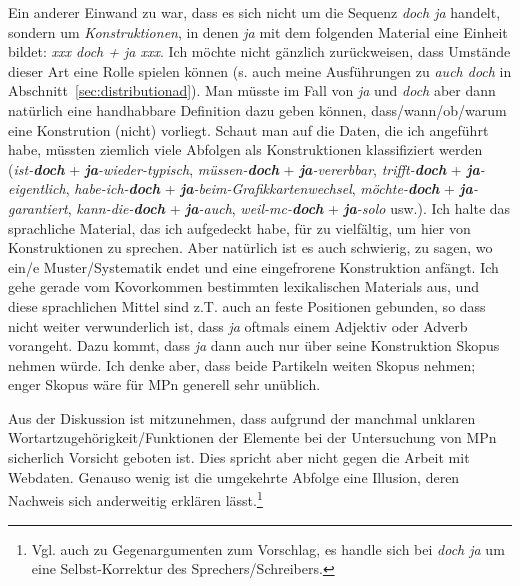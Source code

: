 Ein anderer Einwand zu \citet{Mueller2017b} war, dass es sich nicht um die Sequenz \textit{doch ja} handelt, sondern  um \textit{Konstruktionen}, in denen \textit{ja} mit dem folgenden Material eine Einheit bildet: \textit{xxx doch + ja xxx}. Ich möchte nicht gänz\-lich zurückweisen, dass Umstände dieser Art eine Rolle spielen können (s. auch meine Ausführungen zu \textit{auch doch} in Abschnitt~\ref{sec:distributionad}). Man müsste im Fall von \textit{ja} und \textit{doch} aber dann natürlich eine handhabbare Definition dazu geben können, dass/wann/ob/warum eine Konstrution (nicht) vorliegt. Schaut man auf die Daten, die ich angeführt habe, müssten ziemlich viele Abfolgen als Konstruktionen klassifiziert werden (\textit{ist-\textbf{doch}} + \textit{\textbf{ja}-wieder-typisch}, \textit{müssen-\textbf{doch}} + \textit{\textbf{ja}-vererbbar}, \textit{trifft-\textbf{doch}} + \textit{\textbf{ja}-eigentlich}, \textit{habe-ich-\textbf{doch}} + \textit{\textbf{ja}-beim-Grafikkartenwech\-sel}, \textit{möchte-\textbf{doch}} + \textit{\textbf{ja}-garantiert}, \textit{kann-die-\textbf{doch}} + \textit{\textbf{ja}-auch}, \textit{weil-mc-\textbf{doch}} + \textit{\textbf{ja}-solo} usw.). Ich halte das sprachliche Material, das ich aufgedeckt habe, für zu vielfältig, um hier von Konstruktionen zu sprechen. Aber natürlich ist es auch schwierig, zu sagen, wo ein/e Muster/Systematik endet und eine eingefrorene Konstruktion anfängt. Ich gehe gerade vom Kovorkommen bestimmten lexikali\-schen Materials aus, und diese sprachlichen Mittel sind z.T. auch an feste Positionen gebunden, so dass nicht weiter verwunderlich ist, dass \textit{ja} oftmals einem Adjektiv oder Adverb vorangeht. Dazu kommt, dass \textit{ja} dann auch nur über seine Konstruktion Skopus nehmen würde. Ich denke aber, dass beide Partikeln weiten Skopus  nehmen; enger Skopus wäre für MPn generell sehr unüblich.

Aus der Diskussion ist mitzunehmen, dass aufgrund der manchmal unklaren Wortartzugehörigkeit/Funktionen der Elemente bei der Untersuchung von MPn sicherlich Vorsicht geboten ist. Dies spricht aber nicht gegen die Arbeit mit Webdaten. Genauso wenig ist die umgekehrte Abfolge eine Illusion, deren Nachweis sich anderweitig erklären lässt.\footnote{Vgl. auch \citet[232]{Mueller2017b} zu Gegenargumenten zum Vorschlag, es handle sich bei \textit{doch ja} um eine Selbst-Korrektur des Sprechers/Schreibers.}

